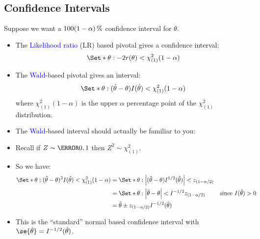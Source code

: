 \documentclass[oneside]{book}\usepackage[]{graphicx}\usepackage[svgnames]{xcolor}
\providecommand\given{} %
\renewcommand\given{\nonscript\:\delimsize\vert\nonscript\:\mathopen{}}%
\renewcommand\given{\nonscript\:\delimsize\vert\nonscript\:\mathopen{}}%
\renewcommand\given{\nonscript\:\delimsize\vert\nonscript\:\mathopen{}}%
\renewcommand\given{\nonscript\:\delimsize\vert\nonscript\:\mathopen{}}%
\renewcommand\given{\nonscript\:\delimsize\vert\nonscript\:\mathopen{}}%
\renewcommand\given{\nonscript\:\delimsize\vert\nonscript\:\mathopen{}}%
\renewcommand\given{\nonscript\:\delimsize\vert\nonscript\:\mathopen{}}%
\renewcommand\given{\nonscript\:\delimsize\vert\nonscript\:\mathopen{}}%
\renewcommand\given{\nonscript\:\delimsize\vert\nonscript\:\mathopen{}}%
\renewcommand\given{\nonscript\:\delimsize\vert\nonscript\:\mathopen{}}%
\renewcommand\given{\nonscript\:\delimsize\vert\nonscript\:\mathopen{}}%
\renewcommand\given{\nonscript\:\delimsize\vert\nonscript\:\mathopen{}}%
\DeclarePairedDelimiter\abs{\lvert}{\rvert}
\renewcommand\given{:}
\begin{document}
\subsection*{Confidence Intervals}
Suppose we want a $ \SI[parse-numbers = false]{100(1-\alpha)}{\percent} $ confidence interval for $ \theta $.
\begin{itemize}
      \item The \textcolor{Blue}{Likelihood ratio} (LR) based pivotal gives a confidence interval:
            \[ \Set*{\theta\given -2r(\theta)<\chi^2_{(1)}(1-\alpha)} \]
      \item The \textcolor{Blue}{Wald}-based pivotal gives an interval:
            \[ \Set*{\theta\given (\hat{\theta}-\theta)I(\hat{\theta})<\chi^2_{(1)}(1-\alpha)} \]
            where $ \chi^2_{(1)}(1-\alpha) $ is the upper $ \alpha $ percentage point of the $ \chi^2_{(1)} $ distribution.
      \item The \textcolor{Blue}{Wald}-based interval should actually be familiar to you:
      \item Recall if $ Z \sim \N{0,1} $ then $ Z^2 \sim \chi^2_{(1)} $.
      \item So we have:
            \begin{align*}
                  \Set*{\theta\given (\hat{\theta}-\theta)^2 I(\hat{\theta})<\chi^2_{(1)}(1-\alpha)}
                   & =\Set*{\theta\given \abs*{(\hat{\theta}-\theta)I^{1/2}(\hat{\theta})}<z_{(1-\alpha/2)}}                                     \\
                   & =\Set*{\theta\given \abs*{\hat{\theta}-\theta}<I^{-1/2}z_{(1-\alpha/2)}}                &  & \text{since }I(\hat{\theta})>0 \\
                   & =\hat{\theta}\pm z_{(1-\alpha/2)}I^{-1/2}(\hat{\theta})
            \end{align*}
      \item This is the ``standard'' normal based confidence interval with $ \se{\hat{\theta}}=I^{-1/2}(\hat{\theta}) $.
\end{itemize}
\end{document}
